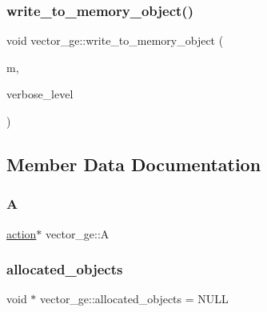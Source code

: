 \subsubsection{\texorpdfstring{write\+\_\+to\+\_\+memory\+\_\+object()}{write\_to\_memory\_object()}}
{\footnotesize\ttfamily void vector\+\_\+ge\+::write\+\_\+to\+\_\+memory\+\_\+object (\begin{DoxyParamCaption}\item[{\mbox{\hyperlink{classmemory__object}{memory\+\_\+object}} $\ast$}]{m,  }\item[{\mbox{\hyperlink{galois_8h_a09fddde158a3a20bd2dcadb609de11dc}{I\+NT}}}]{verbose\+\_\+level }\end{DoxyParamCaption})}



\subsection{Member Data Documentation}
\mbox{\label{classvector__ge_a0b3cff149005f761255906417b1f6d35}} 
\subsubsection{\texorpdfstring{A}{A}}
{\footnotesize\ttfamily \mbox{\hyperlink{classaction}{action}}$\ast$ vector\+\_\+ge\+::A}

\mbox{\label{classvector__ge_a62c6cce667643e45937abd140918d4c4}} 
\subsubsection{\texorpdfstring{allocated\+\_\+objects}{allocated\_objects}}
{\footnotesize\ttfamily void $\ast$ vector\+\_\+ge\+::allocated\+\_\+objects = N\+U\+LL\hspace{0.3cm}{\ttfamily [static]}}

\mbox{\label{classvector__ge_a944ec33149525251e5585f7796a85b7c}} 
